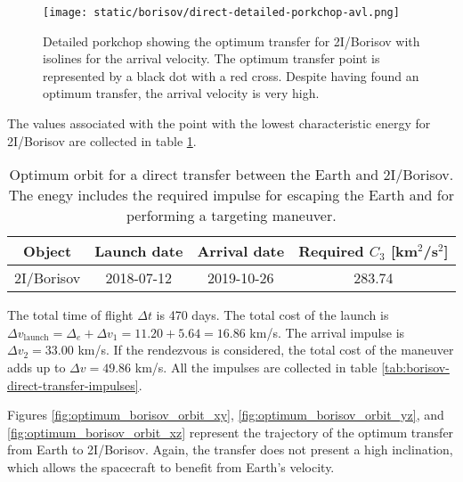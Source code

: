\begin{figure}[H]
  \centering
  \texttt{[image: static/borisov/direct-detailed-porkchop-avl.png]}
  \caption[Detailed porkchop showing the optimum trasnfer for 2I/Borisov
    with the arrival velocity]{Detailed porkchop showing the optimum transfer for
    2I/Borisov with isolines for the arrival velocity. The optimum transfer point is represented by a black dot with a red cross.
    Despite having found an optimum transfer, the arrival velocity is very high.}
  \label{fig:borisov-optimum-transfer-porkchop-avl}
\end{figure}

The values associated with the point with the lowest characteristic energy for
2I/Borisov are collected in table \ref{tab:borisov-direct-transfer-optimum}.

\vspace{1cm}
\begin{table}[H]
  \centering
  \begin{tabular}{|c|c|c|c|}
    \hline
    Object     & Launch date & Arrival date & Required $C_3$ [km$^2$/s$^2$] \\
    \hline
    2I/Borisov & 2018-07-12  & 2019-10-26   & 283.74                        \\
    \hline
  \end{tabular}
  \caption[Optimum orbit for a direct transfer between the Earth and
    2I/Borisov.]{Optimum orbit for a direct transfer between the Earth and
    2I/Borisov. The enegy includes the required impulse for escaping the Earth
    and for performing a targeting maneuver.}
  \label{tab:borisov-direct-transfer-optimum}
\end{table}

The total time of flight $\Delta t$ is 470 days. The total cost of the launch is
$\Delta v_\text{launch} = \Delta_e + \Delta v_1 = 11.20 + 5.64 = 16.86$ km/s.
The arrival impulse is $\Delta v_2 = 33.00$ km/s. If the rendezvous is
considered, the total cost of the maneuver adds up to $\Delta v = 49.86$ km/s.
All the impulses are collected in table
\ref{tab:borisov-direct-transfer-impulses}.

Figures \ref{fig:optimum_borisov_orbit_xy}, \ref{fig:optimum_borisov_orbit_yz},
and \ref{fig:optimum_borisov_orbit_xz} represent the trajectory of the optimum
transfer from Earth to 2I/Borisov. Again, the transfer does not present a high
inclination, which allows the spacecraft to benefit from Earth's velocity.

